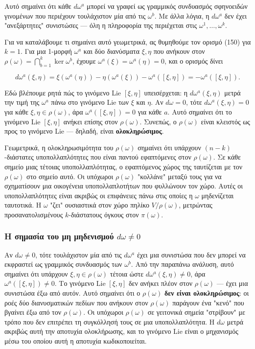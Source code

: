 \documentclass[12pt]{article}
\begin{document}
Αυτό σημαίνει ότι κάθε $d\omega^a$ μπορεί να γραφεί ως γραμμικός συνδυασμός σφηνοειδών γινομένων που περιέχουν τουλάχιστον μία από τις $\omega^b$. Με άλλα λόγια, η $d\omega^a$ δεν έχει "ανεξάρτητες" συνιστώσες — όλη η πληροφορία της περιέχεται στις $\omega^1, \dots, \omega^k$.

Για να καταλάβουμε τι σημαίνει αυτό γεωμετρικά, ας θυμηθούμε τον ορισμό (150) για $k=1$. Για μια 1-μορφή $\omega^a$ και δύο διανύσματα $\xi, \eta$ που ανήκουν στον $\rho(\omega) = \bigcap_{b=1}^k \ker \omega^b$, έχουμε $\omega^a(\xi) = \omega^a(\eta) = 0$, και ο ορισμός δίνει

\[
d\omega^a(\xi, \eta) = \xi(\omega^a(\eta)) - \eta(\omega^a(\xi)) - \omega^a([\xi, \eta]) = -\omega^a([\xi, \eta]).
\]

Εδώ βλέπουμε ρητά πώς το γινόμενο Lie $[\xi, \eta]$ υπεισέρχεται: η $d\omega^a(\xi, \eta)$ μετρά την τιμή της $\omega^a$ πάνω στο γινόμενο Lie των $\xi$ και $\eta$. Αν $d\omega = 0$, τότε $d\omega^a(\xi, \eta) = 0$ για κάθε $\xi, \eta \in \rho(\omega)$, άρα $\omega^a([\xi, \eta]) = 0$ για κάθε $a$. Αυτό σημαίνει ότι το γινόμενο Lie $[\xi, \eta]$ ανήκει επίσης στον $\rho(\omega)$. Συνεπώς, ο $\rho(\omega)$ είναι κλειστός ως προς το γινόμενο Lie — δηλαδή, είναι \textbf{ολοκληρώσιμος}.

Γεωμετρικά, η ολοκληρωσιμότητα του $\rho(\omega)$ σημαίνει ότι υπάρχουν $(n-k)$-διάστατες υποπολλαπλότητες που είναι παντού εφαπτόμενες στον $\rho(\omega)$. Σε κάθε σημείο μιας τέτοιας υποπολλαπλότητας, ο εφαπτόμενος χώρος της ταυτίζεται με τον $\rho(\omega)$ στο σημείο αυτό. Οι υπόχωροι $\rho(\omega)$ "κολλάνε" μεταξύ τους για να σχηματίσουν μια οικογένεια υποπολλαπλοτήτων που φυλλώνουν τον χώρο. Αυτές οι υποπολλαπλότητες είναι ακριβώς οι επιφάνειες πάνω στις οποίες η $\omega$ μηδενίζεται ταυτοτικά. Η $\omega$ "ζει" ουσιαστικά στον χώρο πηλίκο $V/\rho(\omega)$, μετρώντας προσανατολισμένους $k$-διάστατους όγκους στον $\pi(\omega)$.

\subsubsection{Η σημασία του μη μηδενισμού $d\omega \neq 0$}

Αν $d\omega \neq 0$, τότε τουλάχιστον μία από τις $d\omega^a$ έχει μια συνιστώσα που δεν μπορεί να εκφραστεί ως γραμμικός συνδυασμός των $\omega^b$. Από την παραπάνω ανάλυση, αυτό σημαίνει ότι υπάρχουν $\xi, \eta \in \rho(\omega)$ τέτοια ώστε $d\omega^a(\xi, \eta) \neq 0$, άρα $\omega^a([\xi, \eta]) \neq 0$. Το γινόμενο Lie $[\xi, \eta]$ δεν ανήκει πλέον στον $\rho(\omega)$ — έχει μια συνιστώσα έξω από αυτόν. Αυτό σημαίνει ότι ο $\rho(\omega)$ \textbf{δεν είναι ολοκληρώσιμος}: οι ροές δύο διανυσματικών πεδίων που ανήκουν στον $\rho(\omega)$ παράγουν ένα "κενό" που βγαίνει έξω από τον $\rho(\omega)$. Οι υπόχωροι $\rho(\omega)$ σε γειτονικά σημεία "στρίβουν" με τρόπο που δεν επιτρέπει τη συγκόλλησή τους σε μια υποπολλαπλότητα. Η $d\omega$ μετρά ακριβώς αυτή την αποτυχία ολοκλήρωσης, και το γινόμενο Lie είναι ο μηχανισμός μέσω του οποίου αυτή η αποτυχία κωδικοποιείται.
\end{document}
